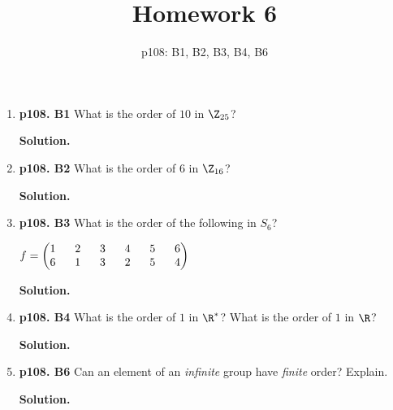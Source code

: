 \documentclass[11pt]{article}
\begin{document}
\title{Homework 6}
\date{p108: B1, B2, B3, B4, B6}
\maketitle

\thispagestyle{fancy}  
\pagestyle{fancy}      

\begin{enumerate}

\item {\bfseries p108. B1} What is the order of $10$ in $\Z_{25}$?
  
  {\bfseries Solution.}

\item {\bfseries p108. B2} What is the order of $6$ in $\Z_{16}$?
  
  {\bfseries Solution.}

\item {\bfseries p108. B3} What is the order of the following in $S_6$?

	$f = \begin{pmatrix}
		1 \hspace{6mm} 2 \hspace{6mm} 3 \hspace{6mm} 4 \hspace{6mm} 5 \hspace{6mm} 6 \\
		6 \hspace{6mm} 1 \hspace{6mm} 3 \hspace{6mm} 2 \hspace{6mm} 5 \hspace{6mm} 4
	\end{pmatrix}$
  
  {\bfseries Solution.}
  
\newpage

\item {\bfseries p108. B4} What is the order of $1$ in $\R^*$? What is the order of $1$ in $\R$?
  
  {\bfseries Solution.}

\item {\bfseries p108. B6} Can an element of an \textit{infinite} group have \textit{finite} order? Explain.
  
  {\bfseries Solution.}

\end{enumerate}
\end{document}
